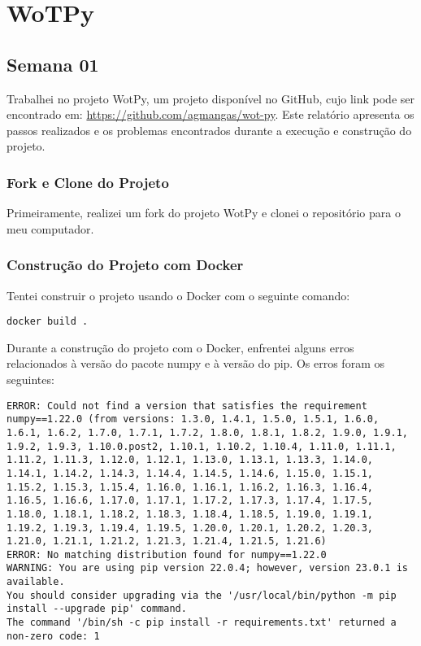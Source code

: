 \chapter{WoTPy}


\section{Semana 01}

Trabalhei no projeto WotPy, um projeto disponível no GitHub, cujo link pode ser encontrado em: \url{https://github.com/agmangas/wot-py}. Este relatório apresenta os passos realizados e os problemas encontrados durante a execução e construção do projeto.

\subsection{Fork e Clone do Projeto}

Primeiramente, realizei um fork do projeto WotPy e clonei o repositório para o meu computador.

\subsection{Construção do Projeto com Docker}

Tentei construir o projeto usando o Docker com o seguinte comando:

\begin{verbatim}
docker build .
\end{verbatim}

Durante a construção do projeto com o Docker, enfrentei alguns erros relacionados à versão do pacote numpy e à versão do pip. Os erros foram os seguintes:

\begin{lstlisting}[breaklines]
ERROR: Could not find a version that satisfies the requirement numpy==1.22.0 (from versions: 1.3.0, 1.4.1, 1.5.0, 1.5.1, 1.6.0, 1.6.1, 1.6.2, 1.7.0, 1.7.1, 1.7.2, 1.8.0, 1.8.1, 1.8.2, 1.9.0, 1.9.1, 1.9.2, 1.9.3, 1.10.0.post2, 1.10.1, 1.10.2, 1.10.4, 1.11.0, 1.11.1, 1.11.2, 1.11.3, 1.12.0, 1.12.1, 1.13.0, 1.13.1, 1.13.3, 1.14.0, 1.14.1, 1.14.2, 1.14.3, 1.14.4, 1.14.5, 1.14.6, 1.15.0, 1.15.1, 1.15.2, 1.15.3, 1.15.4, 1.16.0, 1.16.1, 1.16.2, 1.16.3, 1.16.4, 1.16.5, 1.16.6, 1.17.0, 1.17.1, 1.17.2, 1.17.3, 1.17.4, 1.17.5, 1.18.0, 1.18.1, 1.18.2, 1.18.3, 1.18.4, 1.18.5, 1.19.0, 1.19.1, 1.19.2, 1.19.3, 1.19.4, 1.19.5, 1.20.0, 1.20.1, 1.20.2, 1.20.3, 1.21.0, 1.21.1, 1.21.2, 1.21.3, 1.21.4, 1.21.5, 1.21.6)
ERROR: No matching distribution found for numpy==1.22.0
WARNING: You are using pip version 22.0.4; however, version 23.0.1 is available.
You should consider upgrading via the '/usr/local/bin/python -m pip install --upgrade pip' command.
The command '/bin/sh -c pip install -r requirements.txt' returned a non-zero code: 1
\end{lstlisting}

